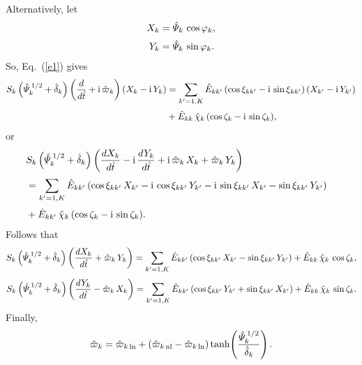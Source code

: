 \documentclass[12pt]{article}
\begin{document}
Alternatively, let
\begin{align}
X_k &= \hat{\mit\Psi}_k\,\cos\varphi_k,\\[0.5ex]
Y_k &= \hat{\mit\Psi}_k\,\sin\varphi_k.
\end{align}
So, Eq.~(\ref{e1}) gives
\begin{align}
S_k\left(\hat{\mit\Psi}_k^{\,1/2} +\hat{\delta}_k\right)\left(\frac{d}{d\hat{t}} + {\rm i}\,\hat{\varpi}_k\right)(X_k - {\rm i}\,Y_k)&=
\sum_{k'=1,K}\hat{E}_{kk'}\,(\cos\xi_{kk'} - {\rm i}\,\sin\xi_{kk'})\,(X_{k'} - {\rm i}\,Y_{k'})\nonumber\\[0.5ex]
&
+ \hat{E}_{kk}\,\hat{\chi}_k\,(\cos\zeta_k - {\rm i }\,\sin\zeta_k),
\end{align}
or
\begin{align}
&S_k\left(\hat{\mit\Psi}_k^{\,1/2} +\hat{\delta}_k\right)\left(\frac{dX_k}{d\hat{t}} - {\rm i}\,\frac{dY_k}{d\hat{t}} + {\rm i}\,\hat{\varpi}_k\,X_k
+\hat{\varpi}_k\,Y_k\right)&\nonumber\\[0.5ex]
&= \sum_{k'=1,K}\hat{E}_{kk'}\,(\cos\xi_{kk'}\,X_{k'} -{\rm i}\,\cos\xi_{kk'}\,Y_{k'}
-{\rm i}\,\sin\xi_{kk'}\,X_{k'} -\sin\xi_{kk'}\,Y_{k'})\nonumber\\[0.5ex]
& + \hat{E}_{kk'}\,\hat{\chi}_k\,(\cos\zeta_k - {\rm i}\,\sin\zeta_k).
\end{align}
Follows that
\begin{align}
S_k\left(\hat{\mit\Psi}_k^{\,1/2} +\hat{\delta}_k\right)\left(\frac{dX_k}{d\hat{t}} 
+\hat{\varpi}_k\,Y_k\right)= \sum_{k'=1,K}\hat{E}_{kk'}\,(\cos\xi_{kk'}\,X_{k'}  -\sin\xi_{kk'}\,Y_{k'}) + \hat{E}_{kk}\,\hat{\chi}_k\,\cos\zeta_k,\\[0.5ex]
S_k\left(\hat{\mit\Psi}_k^{\,1/2} +\hat{\delta}_k\right)\left(\frac{dY_k}{d\hat{t}} -\hat{\varpi}_k\,X_k\right)
= \sum_{k'=1,K}\hat{E}_{kk'}\,(\cos\xi_{kk'}\,Y_{k'}
+\sin\xi_{kk'}\,X_{k'}) + \hat{E}_{kk}\,\hat{\chi}_k\,\sin\zeta_k.
\end{align}
Finally,
\begin{equation}
\hat{\varpi}_k = \hat{\varpi}_{k\,{\rm ln}} + (\hat{\varpi}_{k\,{\rm nl}}- \hat{\varpi}_{k\,{\rm ln}})\tanh\!\left(\frac{\hat{\mit\Psi}_k^{\,1/2}}{\hat{\delta}_k}\right).
\end{equation}
\end{document}
